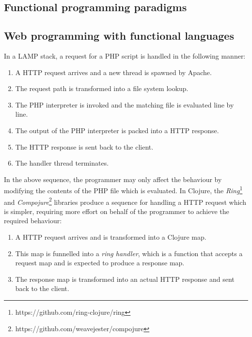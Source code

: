 \subsection{Functional programming paradigms}\label{subsec:functional-programming-paradigms}


\cite{hughes1989functional}


\cite{halloway2009programming, fogus2011joy}


\cite{kraus2009multi}



\subsection{Web programming with functional languages}\label{subsec:functional-web}

In a LAMP stack, a request for a PHP script is handled in the
following manner:

\begin{enumerate}
\item A HTTP request arrives and a new thread is spawned by Apache.
\item The request path is transformed into a file system lookup.
\item The PHP interpreter is invoked and the matching file is
  evaluated line by line.
\item The output of the PHP interpreter is packed into a HTTP
  response.
\item The HTTP response is sent back to the client.
\item The handler thread terminates.
\end{enumerate}

In the above sequence, the programmer may only affect the behaviour by
modifying the contents of the PHP file which is evaluated. In Clojure,
the \textit{Ring}\footnote{https://github.com/ring-clojure/ring} and
\textit{Compojure}\footnote{https://github.com/weavejester/compojure}
libraries produce a sequence for handling a HTTP request which is
simpler, requiring more effort on behalf of the programmer to achieve
the required behaviour:

\begin{enumerate}
\item A HTTP request arrives and is transformed into a Clojure map.
\item This map is funnelled into a \textit{ring handler}, which is a
  function that accepts a request map and is expected to produce a
  response map.
\item The response map is transformed into an actual HTTP response and
  sent back to the client.
\end{enumerate}



